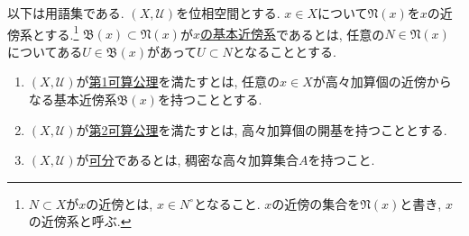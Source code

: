 \documentclass[dvipdfmx,a4paper,11pt]{article}
\newcommand{\R}{\mathbb{R}}
\theoremstyle{definition}
\begin{document}

以下は用語集である.
 $(X, \mathscr{U})$を位相空間とする. $x\in X$について$\mathfrak{N}(x) $を$x$の近傍系とする.\footnote{$N \subset X$が$x$の近傍とは, $x \in N^{\circ}$となること. $x$の近傍の集合を$\mathfrak{N}(x) $と書き, $x$の近傍系と呼ぶ.} 
$\mathfrak{B}(x) \subset \mathfrak{N}(x) $が\underline{$x$の基本近傍系}であるとは, 任意の$N \in \mathfrak{N}(x)$についてある$U \in \mathfrak{B}(x)$があって$U \subset N$となることとする.
    \begin{tcolorbox}[
    colback = white,
    colframe = green!35!black,
    fonttitle = \bfseries,
    breakable = true]
\begin{enumerate}
\setlength{\parskip}{0cm} 
  \setlength{\itemsep}{4pt} 
\item $(X, \mathscr{U})$が\underline{第1可算公理}を満たすとは, 任意の$x \in X$が高々加算個の近傍からなる基本近傍系$\mathfrak{B}(x)$を持つこととする.
\item $(X, \mathscr{U})$が\underline{第2可算公理}を満たすとは, 高々加算個の開基を持つこととする.
\item $(X, \mathscr{U})$が\underline{可分}であるとは, 稠密な高々加算集合$A$を持つこと.
\end{enumerate}
 \end{tcolorbox}
\end{document}
